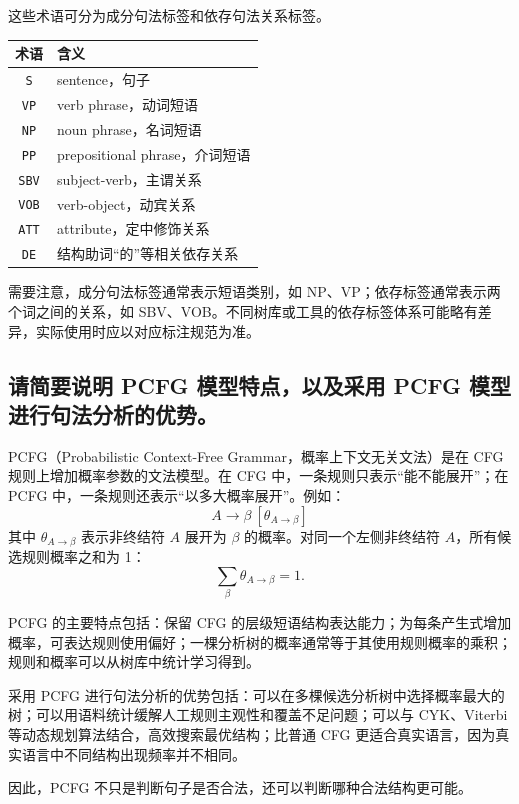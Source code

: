 这些术语可分为成分句法标签和依存句法关系标签。

\begin{table}[H]
\centering
\small
\begin{tabular}{|c|l|}
\hline
术语 & 含义 \\ \hline
\texttt{S} & sentence，句子 \\ \hline
\texttt{VP} & verb phrase，动词短语 \\ \hline
\texttt{NP} & noun phrase，名词短语 \\ \hline
\texttt{PP} & prepositional phrase，介词短语 \\ \hline
\texttt{SBV} & subject-verb，主谓关系 \\ \hline
\texttt{VOB} & verb-object，动宾关系 \\ \hline
\texttt{ATT} & attribute，定中修饰关系 \\ \hline
\texttt{DE} & 结构助词“的”等相关依存关系 \\ \hline
\end{tabular}
\end{table}

需要注意，成分句法标签通常表示短语类别，如 NP、VP；依存标签通常表示两个词之间的关系，如 SBV、VOB。不同树库或工具的依存标签体系可能略有差异，实际使用时应以对应标注规范为准。

\subsection{请简要说明 PCFG 模型特点，以及采用 PCFG 模型进行句法分析的优势。}

PCFG（Probabilistic Context-Free Grammar，概率上下文无关文法）是在 CFG 规则上增加概率参数的文法模型。在 CFG 中，一条规则只表示“能不能展开”；在 PCFG 中，一条规则还表示“以多大概率展开”。例如：
\[
  A \to \beta \ [\theta_{A\to\beta}]
\]
其中 $\theta_{A\to\beta}$ 表示非终结符 $A$ 展开为 $\beta$ 的概率。对同一个左侧非终结符 $A$，所有候选规则概率之和为 1：
\[
  \sum_{\beta}\theta_{A\to\beta}=1.
\]

PCFG 的主要特点包括：保留 CFG 的层级短语结构表达能力；为每条产生式增加概率，可表达规则使用偏好；一棵分析树的概率通常等于其使用规则概率的乘积；规则和概率可以从树库中统计学习得到。

采用 PCFG 进行句法分析的优势包括：可以在多棵候选分析树中选择概率最大的树；可以用语料统计缓解人工规则主观性和覆盖不足问题；可以与 CYK、Viterbi 等动态规划算法结合，高效搜索最优结构；比普通 CFG 更适合真实语言，因为真实语言中不同结构出现频率并不相同。

因此，PCFG 不只是判断句子是否合法，还可以判断哪种合法结构更可能。

